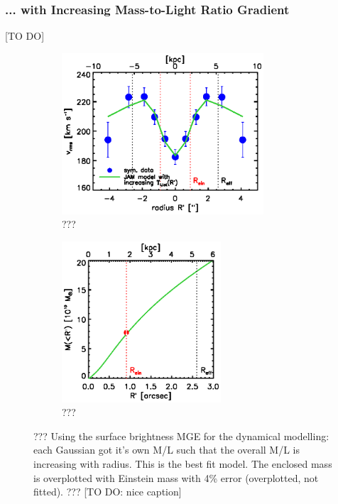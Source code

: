 
\subsubsection{... with Increasing Mass-to-Light Ratio Gradient}

[TO DO]


\begin{figure}
\centering
\begin{subfigure}{.5\textwidth}
  \centering
  \includegraphics[height=6cm]{fig/jam_G_vrms.ps}
  \caption{???}
  \label{fig:???}
\end{subfigure}%
\begin{subfigure}{.5\textwidth}
  \centering
  \includegraphics[height=6cm]{fig/jam_G_enclMass.ps}
  \caption{???}
  \label{fig:???}
\end{subfigure}
\caption{??? Using the surface brightness MGE for the dynamical modelling: each Gaussian got it's own M/L such that the overall M/L is increasing with radius. This is the best fit model. The enclosed mass is overplotted with Einstein mass with 4\% error (overplotted, not fitted). ??? [TO DO: nice caption]}
\label{fig:???}
\end{figure}

